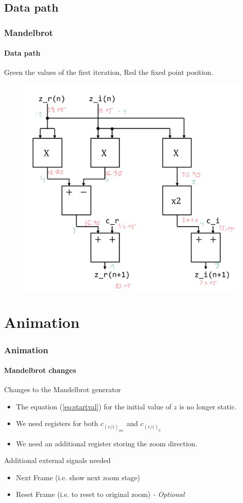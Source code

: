 \documentclass{beamer}
\begin{document}
\subsection{Data path}
\begin{frame}
    \frametitle{Mandelbrot}
    \framesubtitle{Data path}
    Green the values of the first iteration, Red the fixed point position.
    \begin{figure}
        \includegraphics[width=.65\textwidth]{../imgs/data_path_bits.PNG}
    \end{figure}
\end{frame}


\section{Animation}
\begin{frame}
    \sectionpage
\end{frame}
\begin{frame}[label = {Animation}]
    \frametitle{Animation}
    \framesubtitle{Mandelbrot changes}
    \begin{block}{Changes to the Mandelbrot generator}
        \begin{itemize}
            \item The equation (\ref{eq:startval}) for the initial value  of $z$ is no longer static.
            \item We need registers for both $c_{(r/i)_{inc}}$ and $c_{(r/i)_0}$
            \item We need an additional register storing the zoom direction.
        \end{itemize}
    \end{block}
    \begin{alertblock}{Additional external signals needed}
        \begin{itemize}
            \item Next Frame (i.e. show next zoom stage)
            \item Reset Frame (i.e. to reset to original zoom) \emph{- Optional}
        \end{itemize}
    \end{alertblock}
\end{frame}
\end{document}
